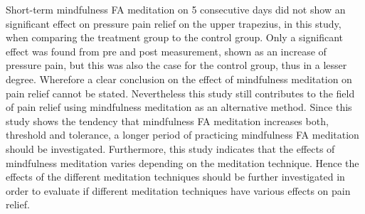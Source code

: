Short-term mindfulness FA meditation on 5 consecutive days did not show an significant effect on pressure pain relief on the upper trapezius, in this study, when comparing the treatment group to the control group. Only a significant effect was found from pre and post measurement, shown as an increase of pressure pain, but this was also the case for the control group, thus in a lesser degree. Wherefore a clear conclusion on the effect of mindfulness meditation on pain relief cannot be stated. Nevertheless this study still contributes to the field of pain relief using mindfulness meditation as an alternative method. Since this study shows the tendency that mindfulness FA meditation increases both, threshold and tolerance, a longer period of practicing mindfulness FA meditation should be investigated. Furthermore, this study indicates that the effects of mindfulness meditation varies depending on the meditation technique. Hence the effects of the different meditation techniques should be further investigated in order to evaluate if different meditation techniques have various effects on pain relief. 